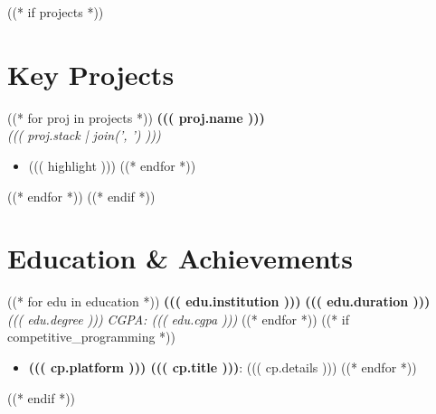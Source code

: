 \documentclass[10pt, a4paper]{article}
\newcommand{\experienceHeading}[4]{%
    \noindent\textbf{#1} \hfill \textbf{#2} \\%
    \noindent\textit{\color{subtextColor}#3} \hfill \textit{\color{subtextColor}#4}%
    \vspace{-0.15em}%
}
\begin{document}
((* if projects *))
\section{Key Projects}
\small
((* for proj in projects *))
\experienceHeading
    {((( proj.name )))}
    {}
    {((( proj.stack | join(', ') )))}
    {}
\begin{itemize}
((* for highlight in proj.highlights *))
    \item ((( highlight )))
((* endfor *))
\end{itemize}
\vspace{0.15em}
((* endfor *))
\vspace{-0.3em}
((* endif *))

\section{Education \& Achievements}
\small
((* for edu in education *))
\noindent\textbf{((( edu.institution )))} \hfill \textbf{((( edu.duration )))} \\
\noindent\textit{\color{subtextColor}((( edu.degree )))} \hfill \textit{\color{subtextColor}CGPA: ((( edu.cgpa )))}
((* endfor *))
\vspace{0.15em}
((* if competitive_programming *))
\begin{itemize}[leftmargin=*,itemsep=-0.15em,topsep=0.1em]
((* for cp in competitive_programming *))
    \item \textbf{((( cp.platform ))) ((( cp.title )))}: ((( cp.details )))
((* endfor *))
\end{itemize}
((* endif *))
\end{document}

